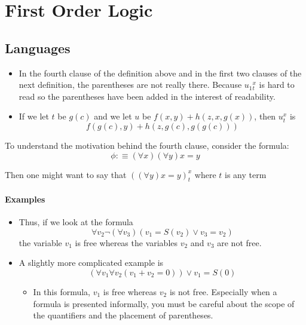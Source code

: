 \chapter{First Order Logic}

\section{Languages}





\begin{itemize}
    \item  In the fourth clause of the definition above and in the first two clauses of the next definition, the parentheses are not really there. Because $u_{1}{ }_{t}^{x}$ is hard to read so the parentheses have been added in the interest of readability.
    \item If we let $t$ be $g(c)$ and we let $u$ be $f(x, y)+h(z, x, g(x))$, then $u_{t}^{x}$ is
        \[
        f(g(c), y)+h(z, g(c), g(g(c)))
        \]
\end{itemize}




To understand the motivation behind the fourth clause, consider the formula:
\[
\phi :\equiv \left( \forall x \right) \left( \forall y \right) x = y
\]

Then one might want to say that $ \left( \left( \forall y \right) x = y \right) _{ t }^{ x }   $  where $ t $ is any term



\subsubsection*{Examples}
\begin{itemize}
    \item Thus, if we look at the formula
    $$
    \forall v_{2} \neg\left(\forall v_{3}\right)\left(v_{1}=S\left(v_{2}\right) \vee v_{3}=v_{2}\right)
    $$
    the variable $v_{1}$ is free whereas the variables $v_{2}$ and $v_{3}$ are not free. 
    \item A slightly more complicated example is
        \[
        \left(\forall v_{1} \forall v_{2}\left(v_{1}+v_{2}=0\right)\right) \vee v_{1}=S(0)
        \]
        \begin{itemize}
            \item In this formula, $v_{1}$ is free whereas $v_{2}$ is not free. Especially when a formula is presented informally, you must be careful about the scope of the quantifiers and the placement of parentheses.
        \end{itemize}
\end{itemize}
